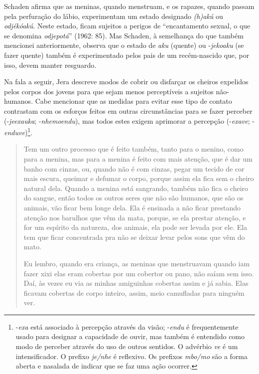 Schaden afirma que as meninas, quando menstruam, e os rapazes, quando
passam pela perfuração do lábio, experimentam um estado designado
\emph{(h)akú} ou \emph{odjékóakú}. Neste estado, ficam sujeitos a perigos de
``encantamento sexual, o que se denomina \emph{odjepotá}'' (1962: 85). Mas
Schaden, à semelhança do que também mencionei anteriormente, observa
que o estado de \emph{aku} (quente) ou -\emph{jekoaku} (se fazer quente) também é
experimentado pelos pais de um recém-nascido que, por isso, devem
manter resguardo. 

Na fala a seguir, Jera descreve modos de cobrir ou disfarçar os cheiros
expelidos pelos corpos dos jovens para que sejam menos perceptíveis a
sujeitos não-humanos. Cabe mencionar que as medidas para evitar esse
tipo de contato contrastam com os esforços feitos em outras
circunstâncias para se fazer perceber (-\emph{jeexauka}; -\emph{nhemoendu}), mas
todos estes exigem aprimorar a percepção (-\emph{exave};
-\emph{enduve})\footnote{-\emph{exa} está associado à percepção através da visão;
-\emph{endu} é frequentemente usado para designar a capacidade de ouvir, mas
também é entendido como modo de perceber através do uso de outros
sentidos. O advérbio \emph{ve} é um intensificador. O prefixo \emph{je/nhe} é
reflexivo. Os prefixos \emph{mbo/mo} são a forma aberta e nasalada de indicar
que se faz uma ação ocorrer. }. 

\begin{quotation}
\noindent
Tem um outro processo que é feito também, tanto para o menino, como para
a menina, mas para a menina é feito com mais atenção, que é dar um
banho com cinzas, ou, quando não é com cinzas, pegar um tecido de cor
mais escura, queimar e defumar o corpo, porque assim ela fica sem o
cheiro natural dela. Quando a menina está sangrando, também não fica o
cheiro do sangue, então todos os outros seres que não são humanos, que
são os animais, vão ficar bem longe dela. Ela é ensinada a não ficar
prestando atenção nos barulhos que vêm da mata, porque, se ela prestar
atenção, e for um espírito da natureza, dos animais, ela pode ser
levada por ele. Ela tem que ficar concentrada pra não se deixar levar
pelos sons que vêm do mato.

\noindent
Eu lembro, quando era criança, as meninas que menstruavam quando iam
fazer xixi elas eram cobertas por um cobertor ou pano, não saíam sem
isso. Daí, às vezes eu via as minhas amiguinhas cobertas assim e já
sabia. Elas ficavam cobertas de corpo inteiro, assim, meio camufladas
para ninguém ver.
\end{quotation}

